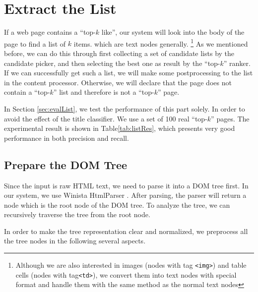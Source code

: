 \section{Extract the List}
\label{sec:extractList}

If a web page contains a ``top-$k$ like'', our system will look into the body of the page to find a list of $k$ items.
which are text nodes generally.
\footnote{Although we are also interested in images (nodes with tag {\tt <img>}) and table cells (nodes with tag{\tt <td>}), we convert them into text nodes with special format and handle them with the same method as the normal text nodes}
As we mentioned before, we can do this through first collecting a set of candidate lists by the candidate picker, and then selecting the best one as result by the ``top-$k$'' ranker.
If we can successfully get such a list, we will make some postprocessing to the list in the content processor.
Otherwise, we will declare that the page does not contain a ``top-$k$'' list and therefore is not a ``top-$k$'' page.

In Section \ref{sec:evalList}, we test the performance of this part solely. In order to avoid the effect of the title classifier. We use a set of 100 real ``top-$k$'' pages. The experimental result is shown in Table\ref{tab:listRes}, which presents very good performance in both precision and recall.

\subsection{Prepare the DOM Tree}
Since the input is raw HTML text, we need to parse it into a DOM tree first.
In our system, we use Winista HtmlParser \cite{winista}.
After parsing, the parser will return a node which is the root node of the DOM tree.
To analyze the tree, we can recursively traverse the tree from the root node.

In order to make the tree representation clear and normalized, we preprocess all the tree nodes in the following several aspects.

